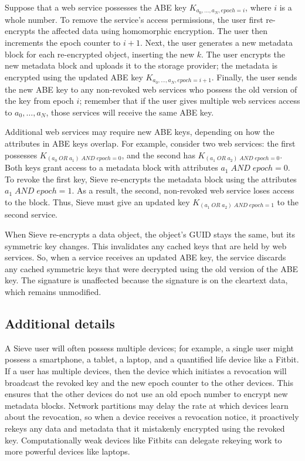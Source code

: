 Suppose that a web service possesses the ABE
key $K_{a_0,\ldots,a_N,epoch=i}$, where $i$ is a
whole number. To remove the service's access
permissions, the user first re-encrypts the
affected data using homomorphic encryption.
The user then increments the epoch counter to
$i+1$. Next, the user generates a new metadata
block for each re-encrypted object, inserting
the new $k$. The user encrypts the new metadata
block and uploads it to the storage provider;
the metadata is encrypted using the updated
ABE key $K_{a_0,\ldots,a_N,epoch=i+1}$. Finally, the
user sends the new ABE key to any non-revoked
web services who possess the old version of
the key from epoch $i$; remember that if the
user gives multiple web services access to
$a_0,\ldots,a_N$, those services will receive
the same ABE key.

Additional web services may require new ABE
keys, depending on how the attributes in ABE
keys overlap. For example, consider two web services:
the first possesses $K_{(a_0\; OR\; a_1)\; AND\; epoch=0}$,
and the second has $K_{(a_1\; OR\; a_2)\; AND\; epoch=0}$.
Both keys grant access to a metadata block
with attributes $a_1\; AND\; epoch=0$. To revoke
the first key, Sieve re-encrypts the metadata
block using the attributes $a_1\; AND\; epoch=1$.
As a result, the second, non-revoked web service
loses access to the block. Thus, Sieve must
give an updated key $K_{(a_1\; OR\; a_2)\; AND\; epoch=1}$
to the second service.

When Sieve re-encrypts a data object, the
object's GUID stays the same, but its symmetric
key changes. This invalidates any cached keys
that are held by web services. So, when a
service receives an updated ABE key, the
service discards any cached symmetric keys
that were decrypted using the old version
of the ABE key. The signature is unaffected
because the signature is on the cleartext data, which
remains unmodified.


\subsection{Additional details} A Sieve user
will often possess multiple devices; for example,
a single user might possess a smartphone, a tablet, a
laptop, and a quantified life device like a
Fitbit. If a user has multiple devices, then
the device which initiates a revocation will
broadcast the revoked key and the new epoch
counter to the other devices. This ensures
that the other devices do not use an old epoch
number to encrypt new metadata blocks. Network
partitions may delay the rate at which devices
learn about the revocation, so when a device
receives a revocation notice, it proactively
rekeys any data and metadata that it mistakenly
encrypted using the revoked key. Computationally
weak devices like Fitbits can delegate rekeying
work to more powerful devices like laptops.


